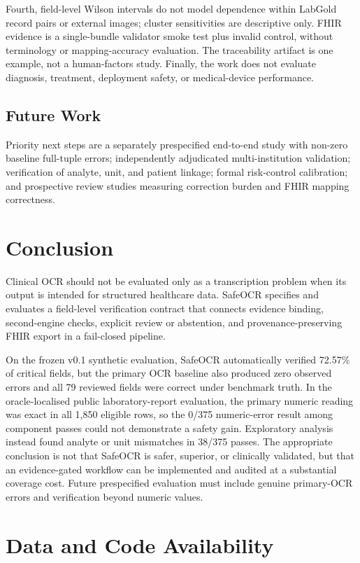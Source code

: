 \documentclass[10pt]{article}
\begin{document}
Fourth, field-level Wilson intervals do not model dependence within LabGold record pairs or external images; cluster sensitivities are descriptive only. FHIR evidence is a single-bundle validator smoke test plus invalid control, without terminology or mapping-accuracy evaluation. The traceability artifact is one example, not a human-factors study. Finally, the work does not evaluate diagnosis, treatment, deployment safety, or medical-device performance.

\subsection{Future Work}

Priority next steps are a separately prespecified end-to-end study with non-zero baseline full-tuple errors; independently adjudicated multi-institution validation; verification of analyte, unit, and patient linkage; formal risk-control calibration; and prospective review studies measuring correction burden and FHIR mapping correctness.

\section{Conclusion}

Clinical OCR should not be evaluated only as a transcription problem when its output is intended for structured healthcare data. SafeOCR specifies and evaluates a field-level verification contract that connects evidence binding, second-engine checks, explicit review or abstention, and provenance-preserving FHIR export in a fail-closed pipeline.

On the frozen v0.1 synthetic evaluation, SafeOCR automatically verified 72.57\% of critical fields, but the primary OCR baseline also produced zero observed errors and all 79 reviewed fields were correct under benchmark truth. In the oracle-localised public laboratory-report evaluation, the primary numeric reading was exact in all 1,850 eligible rows, so the 0/375 numeric-error result among component passes could not demonstrate a safety gain. Exploratory analysis instead found analyte or unit mismatches in 38/375 passes. The appropriate conclusion is not that SafeOCR is safer, superior, or clinically validated, but that an evidence-gated workflow can be implemented and audited at a substantial coverage cost. Future prespecified evaluation must include genuine primary-OCR errors and verification beyond numeric values.

\section*{Data and Code Availability}
\end{document}
